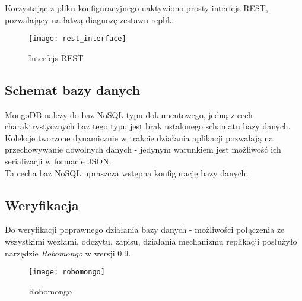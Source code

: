 Korzystając z pliku konfiguracyjnego uaktywiono prosty interfejs REST, pozwalający na łatwą diagnozę zestawu replik.

\begin{figure}[H]
	\centering
	\texttt{[image: rest\_interface]}
	\caption{Interfejs REST}
\end{figure}

\subsection{Schemat bazy danych}
MongoDB należy do baz NoSQL typu dokumentowego, jedną z cech charaktrystycznych baz tego typu jest brak ustalonego schamatu bazy danych. Kolekcje tworzone dynamicznie w trakcie działania aplikacji pozwalają na przechowywanie dowolnych danych - jedynym warunkiem jest możliwość ich serializacji w formacie JSON. \\
Ta cecha baz NoSQL upraszcza wstępną konfigurację bazy danych.

\subsection{Weryfikacja}
Do weryfikacji poprawnego działania bazy danych - możliwości połączenia ze wszystkimi węzłami, odczytu, zapisu, działania mechanizmu replikacji posłużyło narzędzie \textit{Robomongo} w wersji 0.9.

\begin{figure}[H]
	\centering
	\texttt{[image: robomongo]}
	\caption{Robomongo}
\end{figure}
